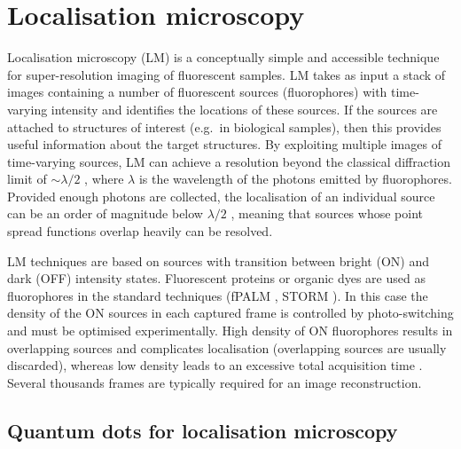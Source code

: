
\section{Localisation microscopy\label{sec:LM}}

Localisation microscopy (LM) is a conceptually simple and accessible technique for super-resolution imaging of fluorescent samples. LM takes as input a stack of images containing a number of fluorescent sources (fluorophores) with time-varying intensity and identifies the locations  of these sources. If the sources are attached to structures of interest (e.g.\ in biological samples), then this provides useful information about the target structures. By exploiting multiple images of time-varying sources, LM can achieve a resolution beyond the classical diffraction limit of $\sim \lambda/2$ \cite{Abbe1873}, where $\lambda$ is the wavelength of the photons emitted by fluorophores. Provided enough photons are collected, the localisation of an individual source can be an order of magnitude below $\lambda/2$ \cite{Ober2004}, meaning that sources whose point spread functions overlap heavily can be resolved. 

LM techniques are based on sources with transition between bright (ON) and dark (OFF) intensity states. Fluorescent proteins or organic dyes are used as fluorophores in the standard techniques (fPALM \cite{Hess2006}, STORM \cite{Rust2006}). In this case the density of the ON sources in each captured frame is controlled by photo-switching and must be optimised experimentally. High density of ON fluorophores results in overlapping sources and complicates localisation (overlapping sources are usually discarded), whereas low density leads to an excessive total acquisition time \cite{Small2009}. Several thousands frames are typically required for an image reconstruction.


\subsection{Quantum dots for localisation microscopy\label{sec:QD for LM}}

